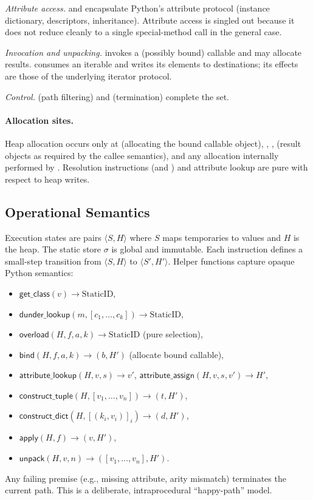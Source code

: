 \smallskip
\noindent\emph{Attribute access.}
\tGetAttr and \tSetAttr encapsulate Python’s attribute protocol (instance dictionary, descriptors, inheritance). Attribute access is singled out because it does not reduce cleanly to a single special-method call in the general case.

\smallskip
\noindent\emph{Invocation and unpacking.}
\tCall invokes a (possibly bound) callable and may allocate results. \tUnpack consumes an iterable and writes its elements to destinations; its effects are those of the underlying iterator protocol.

\smallskip
\noindent\emph{Control.}
\tAssumeEq (path filtering) and \tExit (termination) complete the set.

\paragraph{Allocation sites.}
Heap allocation occurs only at \tBind (allocating the bound callable object), \tConstructTuple, \tConstructDict, \tCall (result objects as required by the callee semantics), and any allocation internally performed by \tUnpack. Resolution instructions (\tLookupDunder and \tResolveOverload) and attribute lookup are pure with respect to heap writes.

\subsection{Operational Semantics}

Execution states are pairs $\langle  S, H \rangle$ where $ S$ maps temporaries to values and $H$ is the heap. The static store $\sigma$ is global and immutable. Each instruction defines a small-step transition from $\langle  S, H \rangle$ to $\langle  S', H' \rangle$. Helper functions capture opaque Python semantics:
\begin{itemize}
\item $\mathsf{get\_class}(v) \to \text{StaticID}$,
\item $\mathsf{dunder\_lookup}(m, [c_1,\ldots,c_k]) \to \text{StaticID}$,
\item $\mathsf{overload}(H, f, a, k) \to \text{StaticID}$ (pure selection),
\item $\mathsf{bind}(H, f, a, k) \to (b, H')$ (allocate bound callable),
\item $\mathsf{attribute\_lookup}(H, v, s) \to v'$, $\mathsf{attribute\_assign}(H, v, s, v') \to H'$,
\item $\mathsf{construct\_tuple}(H, [v_1,\ldots,v_n]) \to (t, H')$,
\item $\mathsf{construct\_dict}(H, [(k_i,v_i)]_i) \to (d, H')$,
\item $\mathsf{apply}(H, f) \to (v, H')$,
\item $\mathsf{unpack}(H, v, n) \to ([v_1,\ldots,v_n], H')$.
\end{itemize}
Any failing premise (e.g., missing attribute, arity mismatch) terminates the current path. This is a deliberate, intraprocedural ``happy-path'' model.

